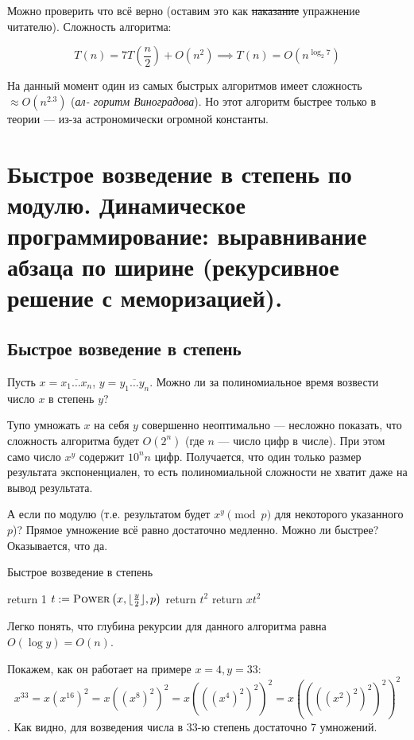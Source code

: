 \documentclass[a4paper,12pt]{article}
\begin{document}
Можно проверить что всё верно (оставим это как \sout{наказание} упражнение читателю). Сложность алгоритма:

\[T(n) = 7T\left( \frac{n}{2} \right) + O(n^2) \implies T(n) = O\left(n^{\log_{2} 7} \right)\]

На данный момент один из самых быстрых алгоритмов имеет сложность \(\approx O(n^{2.3})\) (\emph{ал-
горитм Виноградова}). Но этот алгоритм быстрее только в теории — из-за астрономически
огромной константы.
\newpage
\section{Быстрое возведение в степень по модулю. Динамическое программирование: выравнивание абзаца по ширине (рекурсивное решение с меморизацией).}

\subsection{Быстрое возведение в степень}
Пусть \(x = \overline{x_1 \ldots x_n}\), \(y = \overline{y_1 \ldots y_n}\). Можно ли за полиномиальное время возвести число $x$ в степень $y$?

Тупо умножать $x$ на себя $y$ совершенно неоптимально --- несложно показать, что сложность алгоритма будет $O(2^n)$ (где $n$ --- число цифр в числе). При этом само число $x^y$ содержит \(10^{n}n\) цифр. Получается, что один только размер результата экспоненциален, то есть полиномиальной сложности не хватит даже на вывод результата.

А если по модулю (т.е. результатом будет \(x^y \pmod{p}\) для некоторого указанного \(p\))? Прямое умножение всё равно достаточно медленно. Можно ли быстрее? Оказывается, что да.

\begin{algorithm}
	\caption{Быстрое возведение в степень}
	\begin{algorithmic}[1]
			\State return 1
		\EndIf
		\State \(t \mathrel{:=} \textsc{Power}\left(x, \lfloor\frac{y}{2}\rfloor, p \right)\)
			\State return \(t^2\)
		\Else
			\State return \(xt^2\)
		\EndIf
		\EndFunction
	\end{algorithmic}
\end{algorithm}

Легко понять, что глубина рекурсии для данного алгоритма равна $O(\log y) = O(n)$.

Покажем, как он работает на примере \(x = 4, y = 33\): \[x^{33} = x(x^{16})^{2} = x((x^{8})^2)^2 = x(((x^4)^2)^2)^2 = x((((x^2)^2)^2)^2)^2 \].
Как видно, для возведения числа в 33-ю степень достаточно 7 умножений.
\end{document}
